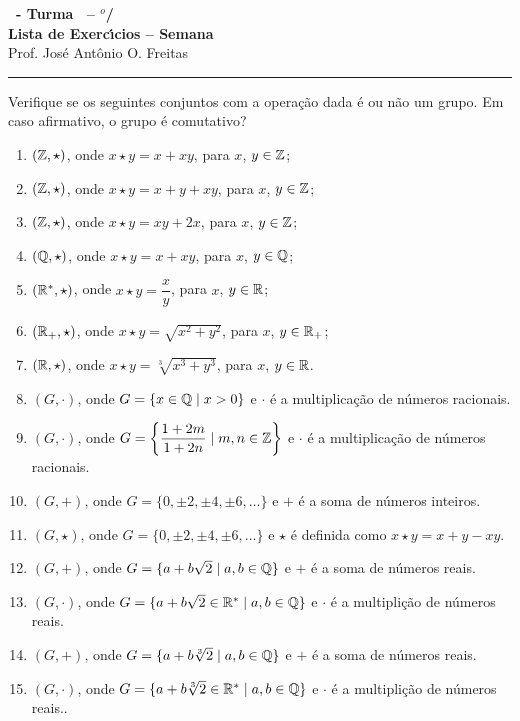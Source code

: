 \documentclass[12pt]{exam}
\begin{document}
\begin{center}
    
    {\Large\bf \disciplina\ - Turma \turma\ -- \semestre$^{o}$/\ano} \\ \vspace{9pt} {\large\bf
        Lista de Exerc{\'\i}cios -- Semana \numerosemana}\\ \vspace{9pt} Prof. Jos{\'e} Ant{\^o}nio O. Freitas
    \end{center}
    \hrule

    \vspace{.6cm}
    \questao{} Verifique se os seguintes conjuntos com a opera\c{c}\~ao dada \'e ou n\~ao um grupo. Em caso afirmativo, o grupo \'e comutativo?
\begin{enumerate}[label=({\alph*})]
    \item $(\mathbb{Z}, \star)$, onde $x \star y = x + xy$, para $x$, $y \in \mathbb{Z}$;
    \item $(\mathbb{Z}, \star)$, onde $x \star y = x + y + xy$, para $x$, $y \in \mathbb{Z}$;
    \item $(\mathbb{Z}, \star)$, onde $x \star y = xy + 2x$, para $x$, $y \in \mathbb{Z}$;
    \item $(\mathbb{Q}, \star)$, onde $x \star y = x + xy$, para $x$, $y \in \mathbb{Q}$;
    \item $(\mathbb{R}^*, \star)$, onde $x \star y = \dfrac{x}{y}$, para $x$, $y \in \mathbb{R}$;
    \item $(\mathbb{R}_+, \star)$, onde $x \star y = \sqrt{x^2 + y^2}$, para $x$, $y \in \mathbb{R}_+$;
    \item $(\mathbb{R}, \star)$, onde $x \star y = \sqrt[3]{x^3 + y^3}$, para $x$, $y \in \mathbb{R}$.
    \item $(G, \cdot)$, onde $G = \{x \in \mathbb{Q} \mid x > 0\}$ e $\cdot$ \'e a multiplica\c{c}\~ao de n\'umeros racionais.
    \item $(G, \cdot)$, onde $G = \left\{\dfrac{1 + 2m}{1 + 2n} \mid m, n \in \mathbb{Z}\right\}$ e $\cdot$ \'e a multiplica\c{c}\~ao de n\'umeros racionais.
    \item $(G, +)$, onde $G = \{0, \pm 2, \pm 4, \pm 6, \dots\}$ e $+$ \'e a soma de n\'umeros inteiros.
    \item $(G, \star)$, onde $G = \{0, \pm 2, \pm 4, \pm 6, \dots\}$ e $\star$ \'e definida como $x \star y = x + y - xy$.
    \item $(G, +)$, onde $G = \{a + b\sqrt{2} \mid a, b \in \mathbb{Q}\}$ e $+$ \'e a soma de n\'umeros reais.
    \item $(G, \cdot)$, onde $G = \{a + b\sqrt{2} \in \mathbb{R}^* \mid a, b \in \mathbb{Q}\}$ e $\cdot$ \'e a multipli\c{c}\~ao de n\'umeros reais.
    \item $(G, +)$, onde $G = \{a + b\sqrt[3]{2} \mid a, b \in \mathbb{Q}\}$ e $+$ \'e a soma de n\'umeros reais.
    \item $(G, \cdot)$, onde $G = \{a + b\sqrt[3]{2} \in \mathbb{R}^* \mid a, b \in \mathbb{Q}\}$ e $\cdot$ \'e a multipli\c{c}\~ao de n\'umeros reais..
\end{enumerate}
\end{document}
